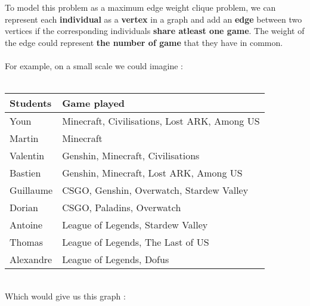 \\ \\
To model this problem as a maximum edge weight clique problem, we can represent each \textbf{individual} as a \textbf{vertex} in a graph and add an \textbf{edge} between two vertices if the corresponding individuals \textbf{share atleast one game}. The weight of the edge could represent \textbf{the number of game} that they have in common.
\\ \\
For example, on a small scale we could imagine :
\\ \\
\begin{tabular}{|p{}|p{}|}
    \hline
    \textbf{Students} & \textbf{Game played}                         \\
    \hline
    Youn              & Minecraft, Civilisations, Lost ARK, Among US \\
    \hline
    Martin            & Minecraft                                    \\
    \hline
    Valentin          & Genshin, Minecraft, Civilisations            \\
    \hline
    Bastien           & Genshin, Minecraft, Lost ARK, Among US       \\
    \hline
    Guillaume         & CSGO, Genshin, Overwatch, Stardew Valley     \\
    \hline
    Dorian            & CSGO, Paladins, Overwatch                    \\
    \hline
    Antoine           & League of Legends, Stardew Valley            \\
    \hline
    Thomas            & League of Legends, The Last of US            \\
    \hline
    Alexandre         & League of Legends, Dofus                     \\
    \hline
\end{tabular}
\vspace{1\baselineskip} \\
Which would give us this graph :

\begin{center}
\end{center}

